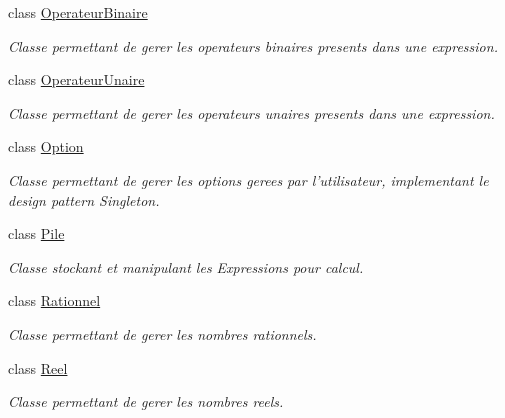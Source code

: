 \begin{DoxyCompactItemize}
class \hyperlink{class_l_o21_1_1_operateur_binaire}{\-Operateur\-Binaire}
\begin{DoxyCompactList}\small\item\em \-Classe permettant de gerer les operateurs binaires presents dans une expression. \end{DoxyCompactList}\item 
class \hyperlink{class_l_o21_1_1_operateur_unaire}{\-Operateur\-Unaire}
\begin{DoxyCompactList}\small\item\em \-Classe permettant de gerer les operateurs unaires presents dans une expression. \end{DoxyCompactList}\item 
class \hyperlink{class_l_o21_1_1_option}{\-Option}
\begin{DoxyCompactList}\small\item\em \-Classe permettant de gerer les options gerees par l'utilisateur, implementant le design pattern \-Singleton. \end{DoxyCompactList}\item 
class \hyperlink{class_l_o21_1_1_pile}{\-Pile}
\begin{DoxyCompactList}\small\item\em \-Classe stockant et manipulant les \-Expressions pour calcul. \end{DoxyCompactList}\item 
class \hyperlink{class_l_o21_1_1_rationnel}{\-Rationnel}
\begin{DoxyCompactList}\small\item\em \-Classe permettant de gerer les nombres rationnels. \end{DoxyCompactList}\item 
class \hyperlink{class_l_o21_1_1_reel}{\-Reel}
\begin{DoxyCompactList}\small\item\em \-Classe permettant de gerer les nombres reels. \end{DoxyCompactList}\end{DoxyCompactItemize}
